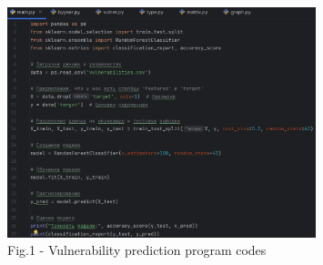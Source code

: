 \begin{figure}[H]
	\centering
	\includegraphics[width=0.8\textwidth]{media/ict2/image165}
	\caption*{Fig.1 - Vulnerability prediction program codes}
\end{figure}

